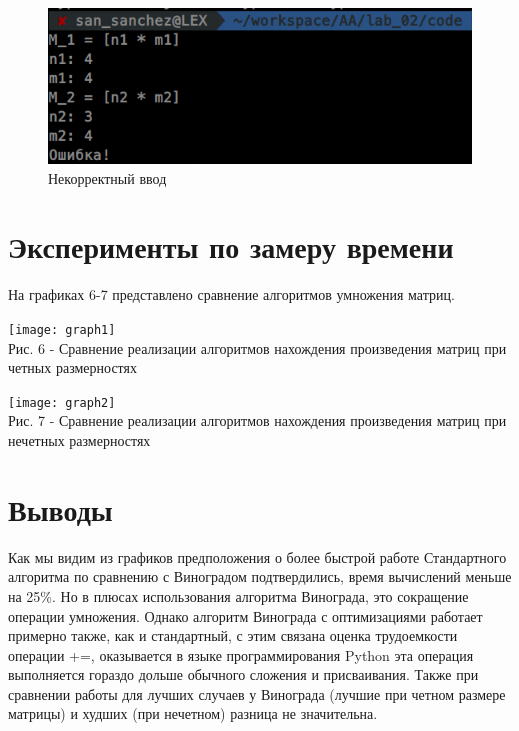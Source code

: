 \begin{figure}[H]
\centering
\includegraphics[scale=0.75]{./pict/wrk4.png}
\caption{Некорректный ввод}
\end{figure}

\newpage
\section{Эксперименты по замеру времени}
На графиках 6-7 представлено сравнение алгоритмов умножения матриц. 
	\begin{center}
        		\texttt{[image: graph1]} \\ Рис. 6 - Сравнение реализации алгоритмов нахождения произведения матриц при четных размерностях
	\end{center}
	
	\begin{center}
        		\texttt{[image: graph2]} \\ Рис. 7 - Сравнение реализации алгоритмов нахождения произведения матриц при нечетных размерностях
	\end{center}
	
\section{Выводы}
	Как мы видим из графиков предположения о более быстрой работе Стандартного алгоритма по сравнению с Виноградом подтвердились, время вычислений меньше на 25\%. Но в плюсах использования алгоритма Винограда, это сокращение операции умножения. 
	Однако алгоритм Винограда с оптимизациями работает примерно также, как и стандартный, с этим связана оценка трудоемкости операции +=, оказывается в языке программирования Python эта операция выполняется гораздо дольше обычного сложения и присваивания.
	Также при сравнении работы для лучших случаев у Винограда (лучшие при четном размере матрицы) и худших (при нечетном) разница не значительна. 
\pagebreak

